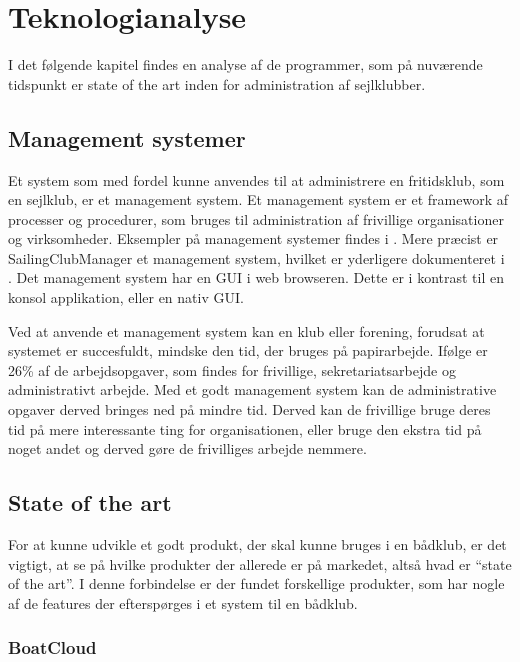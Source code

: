 \chapter{Teknologianalyse}\label{chap:teknologi-analyse}

I det følgende kapitel findes en analyse af de programmer, som på nuværende
tidspunkt er state of the art inden for administration af sejlklubber.


\section{Management systemer}\label{subsec:management-systemer}

Et system som med fordel kunne anvendes til at administrere en fritidsklub, som en sejlklub, er et management system. Et management system er et
framework af processer og procedurer, som bruges til administration af frivillige organisationer og
virksomheder. 
Eksempler på management systemer findes i . 
Mere præcist er SailingClubManager et management system, hvilket er yderligere dokumenteret i . Det management system har en \ac{GUI} i web browseren. Dette er i kontrast til en konsol applikation, eller en nativ \ac{GUI}.

Ved at anvende et management system kan en klub eller forening, forudsat at systemet er succesfuldt, mindske den
tid, der bruges på papirarbejde. Ifølge
\citet{Frivilligrapporten} er 26\% af de arbejdsopgaver, som findes for frivillige, sekretariatsarbejde og
administrativt arbejde. 
Med et godt management system kan de administrative opgaver derved bringes ned på mindre tid. 
Derved kan de frivillige bruge deres tid på mere interessante ting for organisationen, eller bruge den ekstra tid på noget andet og derved gøre de frivilliges arbejde nemmere.


\section{State of the art}\label{sec:sota}

For at kunne udvikle et godt produkt, der skal kunne bruges i en bådklub, er det vigtigt, at se på hvilke
produkter der allerede er på markedet, altså hvad er ``state of the art''. 
I denne forbindelse er der fundet forskellige produkter, som har nogle af de features der efterspørges i et system til en bådklub.


\subsection*{BoatCloud}

